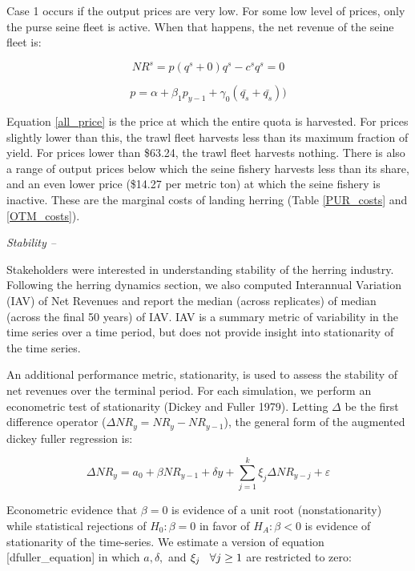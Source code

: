 \documentclass[]{article}
\begin{document}
Case 1 occurs if the output prices are very low. For some low level of
prices, only the purse seine fleet is active. When that happens, the net
revenue of the seine fleet is:

\begin{equation}
NR^s=p(q^s+0)q^s -c^sq^s=0
\end{equation}

\iffalse  Subsequent equation appears out of nowhere. \fi

\begin{equation}
\label{all_price}
p=\alpha + \beta_1 p_{y-1} + \gamma_0(\bar{q_{s}}+\bar{q_{s}}) )
\end{equation}

Equation \ref{all_price} is the price at which the entire quota is
harvested. For prices slightly lower than this, the trawl fleet harvests
less than its maximum fraction of yield. For prices lower than \$63.24,
the trawl fleet harvests nothing. There is also a range of output prices
below which the seine fishery harvests less than its share, and an even
lower price (\$14.27 per metric ton) at which the seine fishery is
inactive. These are the marginal costs of landing herring (Table
\ref{PUR_costs} and \ref{OTM_costs}).

\emph{Stability --}

Stakeholders were interested in understanding stability of the herring
industry. Following the herring dynamics section, we also computed
Interannual Variation (IAV) of Net Revenues and report the median
(across replicates) of median (across the final 50 years) of IAV. IAV is
a summary metric of variability in the time series over a time period,
but does not provide insight into stationarity of the time series.

An additional performance metric, stationarity, is used to assess the
stability of net revenues over the terminal period. For each simulation,
we perform an econometric test of stationarity (Dickey and Fuller 1979).
Letting \(\Delta\) be the first difference operator
(\(\Delta NR_y= NR_{y}-NR_{y-1}\)), the general form of the augmented
dickey fuller regression is:

\begin{equation}
\Delta NR_{y} = a_0 + \beta  NR_{y-1} + \delta y + \sum_{j=1}^k \xi_j \Delta NR_{y-j} + \varepsilon \label{dfuller_equation}
\end{equation}

Econometric evidence that \(\beta=0\) is evidence of a unit root
(nonstationarity) while statistical rejections of \(H_0: \beta=0\) in
favor of \(H_A: \beta<0\) is evidence of stationarity of the
time-series. We estimate a version of equation {[}dfuller\_equation{]}
in which \(a, \delta,\) and \(\xi_{j} \hspace{3mm} \forall j \ge 1\) are
restricted to zero:
\end{document}
